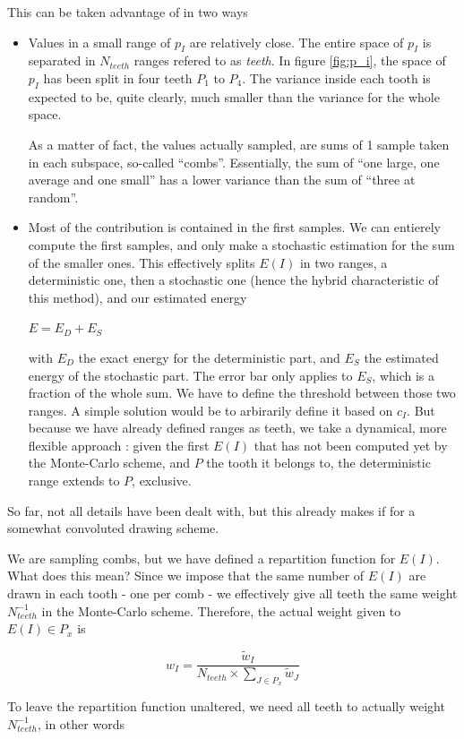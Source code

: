 \documentclass[./thesis.tex]{subfiles}
\begin{document}
This can be taken advantage of in two ways
\begin{itemize}
\item
Values in a small range of $p_I$ are relatively close. The entire space of $p_I$ is separated in $N_{teeth}$ ranges refered to as \emph{teeth}. In figure \ref{fig:p_i}, the space of $p_I$ has been split in four teeth $P_1$ to $P_4$. The variance inside each tooth is expected to be, quite clearly, much smaller than the variance for the whole space.

As a matter of fact, the values actually sampled, are sums of 1 sample taken in each subspace, so-called ``combs''.
Essentially, the sum of ``one large, one average and one small'' has a lower variance than the sum of ``three at random''.
\item
Most of the contribution is contained in the first samples. We can entierely compute the first samples, and only make a stochastic estimation for the sum of the smaller ones. This effectively splits $E(I)$ in two ranges, a deterministic one, then a stochastic one (hence the hybrid characteristic of this method), and our estimated energy

$E = E_D + E_S$

with $E_D$ the exact energy for the deterministic part, and $E_S$ the estimated energy of the stochastic part. The error bar only applies to $E_S$, which is a fraction of the whole sum.
We have to define the threshold between those two ranges. A simple solution would be to arbirarily define it based on $c_I$.
But because we have already defined ranges as teeth, we take a dynamical, more flexible approach : given the first $E(I)$ that has not been computed yet by the Monte-Carlo scheme, and $P$ the tooth it belongs to, the deterministic range extends to $P$, exclusive.
\end{itemize}

So far, not all details have been dealt with, but this already makes if for a somewhat convoluted drawing scheme.

We are sampling combs, but we have defined a repartition function for $E(I)$. What does this mean? Since we impose that the same number of $E(I)$ are drawn in each tooth - one per comb - we effectively give all teeth the same weight $N_{teeth}^{-1}$ in the Monte-Carlo scheme. Therefore, the actual weight given to $E(I) \in P_x$ is

$$w_I = \frac{\tilde w_I}{N_{teeth} \times \sum_{J \in P_x} \tilde w_J}$$

To leave the repartition function unaltered, we need all teeth to actually weight $N_{teeth}^{-1}$, in other words
\end{document}
